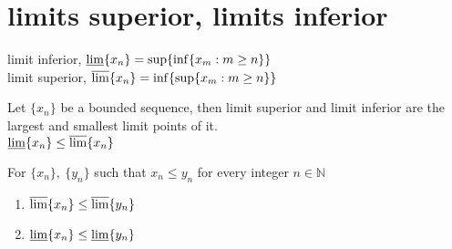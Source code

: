 \section{limits superior, limits inferior}
	\begin{definition}
		limit inferior, $\varliminf \{x_n\}= \sup \{ \inf\{x_m : m \ge n\}\}$\\
		limit superior, $\varlimsup \{x_n\}= \inf \{ \sup\{x_m : m \ge n\}\}$
	\end{definition}
	\begin{remark}
		Let $\{x_n\}$ be a bounded sequence, then limit superior and limit inferior are the largest and smallest limit points of it.\cite{alip1}\\
		$\varliminf \{x_n\} \le \varlimsup \{x_n\}$
	\end{remark}
	\begin{remark}
		For $\{ x_n \},\ \{ y_n \}$ such that $x_n \le y_n$ for every integer $n \in \mathbb{N}$
		\begin{enumerate}
			\item $\varlimsup \{x_n\} \le \varlimsup \{y_n\}$
			\item $\varliminf \{x_n\} \le \varliminf \{y_n\}$
		\end{enumerate}
	\end{remark}

